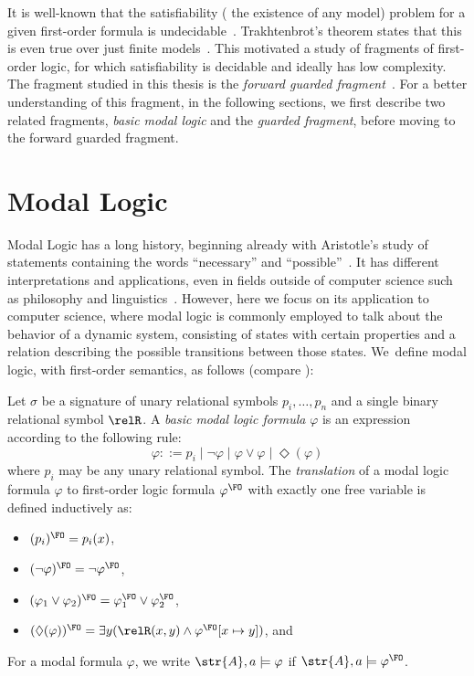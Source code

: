 It is well-known that the satisfiability (\ie{} the existence of any model) problem for a given first-order formula is undecidable~\cite[Sec. 1.1]{borger1997}.
Trakhtenbrot's theorem states that this is even true over just finite models~\cite{trakhtenbrot50}.
This motivated a study of fragments of first-order logic, for which satisfiability is decidable and ideally has low complexity.
The fragment studied in this thesis is the \emph{forward guarded fragment}~\cite[Sec. 3.1]{Bednarczyk21}.
For a better understanding of this fragment, in the following sections, we first describe two related fragments, \emph{basic modal logic} and the \emph{guarded fragment}, before moving to the forward guarded fragment.

\section{Modal Logic}
Modal Logic has a long history, beginning already with Aristotle's study of statements containing the words ``necessary'' and ``possible''~\cite{goldblatt2006}.
It has different interpretations and applications, even in fields outside of computer science such as philosophy and linguistics~\cite{vanBenthem2010-VANMLF-4}.
However, here we focus on its application to computer science, where modal logic is commonly employed to talk about the behavior of a dynamic system, consisting of states with certain properties and a relation describing the possible transitions between those states.
We~define modal logic, with first-order semantics, as follows (compare \cite[Sec. 2.1.2]{otto2004a}):
\begin{definition}
  Let $\sigma$ be a signature of unary relational symbols $p_{i}, \ldots, p_{n}$ and a single binary relational symbol $\relR$.
  A \emph{basic modal logic formula} $\varphi$ is an expression according to the following rule:
  \begin{equation*}
    \varphi ::= p_{i}
      \mid \neg \varphi
      \mid \varphi \lor \varphi
      \mid \Diamond(\varphi)
  \end{equation*}
  where $p_{i}$ may be any unary relational symbol.
  The \emph{translation} of a modal logic formula $\varphi$ to first-order logic formula $\varphi^{\FO}$ with exactly one free variable is defined inductively as:
  \begin{itemize}
    \item $(p_{i})^{\FO} = p_{i}(x)$,
    \item $(\neg \varphi)^{\FO} = \neg \varphi^{\FO}$,
    \item $(\varphi_{1} \lor \varphi_{2})^{\FO} = \varphi_{1}^{\FO} \lor \varphi_{2}^{\FO}$,
    \item $(\Diamond (\varphi))^{\FO} = \exists{y}(\relR(x,y) \land \varphi^{\FO}[x \mapsto y])$, and
  \end{itemize}
  For a modal formula $\varphi$, we write $\str{A}, a \models \varphi$ if $\str{A}, a \models \varphi^{\FO}$.
\end{definition}
